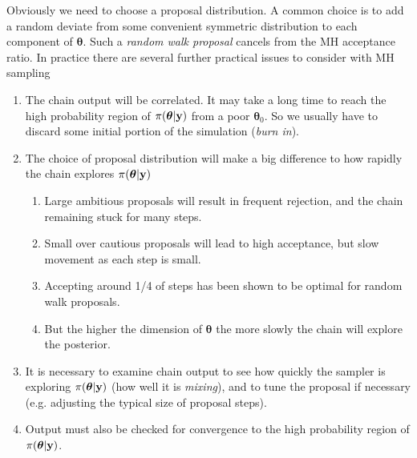 \documentclass[10pt] {article}
\theoremstyle{definition}
\begin{document}
Obviously we need to choose a proposal distribution. A common choice is to add a random deviate from some convenient symmetric distribution to each component of $\bm \theta$. Such a {\em random walk proposal} cancels from the MH acceptance ratio.  In practice there are several further practical issues to consider with MH sampling
\begin{enumerate}
\item The chain output will be correlated. It may take a long time to reach the high probability region of $\pi({\bm \theta}|{\bf y})$ from a poor ${\bm \theta}_0$.
So we usually have to discard some initial portion of the simulation ({\em burn in}).
\item The choice of proposal distribution will make a big difference to how rapidly the chain explores  $\pi({\bm \theta}|{\bf y})$
\begin{enumerate}
\item Large ambitious proposals will result in frequent rejection, and the chain remaining stuck for many steps.
\item Small over cautious proposals will lead to high acceptance, but slow movement as each step is small.
\item Accepting around 1/4 of steps has been shown to be optimal for random walk proposals. 
\item But the higher the dimension of $\bm \theta$ the more slowly the chain will explore the posterior.   
\end{enumerate} 
\item It is necessary to examine chain output to see how quickly the sampler is exploring $\pi({\bm \theta}|{\bf y})$ (how well it is {\em mixing}), and to tune the proposal if necessary (e.g. adjusting the typical size of proposal steps).
\item Output must also be checked for convergence to the high probability region of $\pi({\bm \theta}|{\bf y})$.
\end{enumerate}
\end{document}
